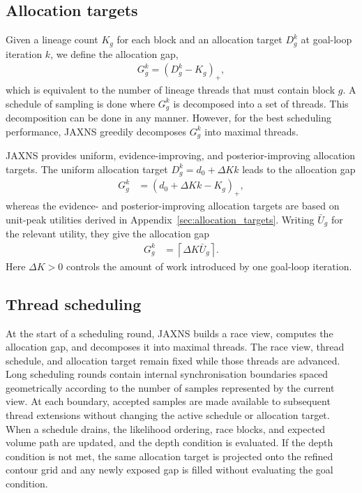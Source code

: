 \documentclass[pdflatex,sn-basic,icol]{sn-jnl}
\theoremstyle{plain}
\theoremstyle{definition}
\begin{document}
\subsection{Allocation targets}
Given a lineage count $K_g$ for each block and an allocation target $D_g^k$ at goal-loop iteration $k$, we define the allocation gap,
\begin{align}
    G_g^k = (D_g^k - K_g)_+,
    \label{eq:allocation_gap}
\end{align}
which is equivalent to the number of lineage threads that must contain block $g$.
A schedule of sampling is done where $G_g^k$ is decomposed into a set of threads.
This decomposition can be done in any manner.
However, for the best scheduling performance, JAXNS greedily decomposes $G_g^k$ into maximal threads.

JAXNS provides uniform, evidence-improving, and posterior-improving allocation targets.
The uniform allocation target $D_g^k=d_0+\Delta K k$ leads to the allocation gap
\begin{align}
    G_g^k &= (d_0+\Delta K k-K_g)_+,
    \label{eq:uniform_allocation_gap}
\end{align}
whereas the evidence- and posterior-improving allocation targets are based on unit-peak utilities derived in Appendix~\ref{sec:allocation_targets}.
Writing $\bar U_g$ for the relevant utility, they give the allocation gap
\begin{align}
    G_g^k &= \left\lceil\Delta K\bar U_g\right\rceil.
    \label{eq:utility_allocation_gap}
\end{align}
Here $\Delta K>0$ controls the amount of work introduced by one goal-loop iteration.

\subsection{Thread scheduling}

At the start of a scheduling round, JAXNS builds a race view, computes the allocation gap, and decomposes it into maximal threads.
The race view, thread schedule, and allocation target remain fixed while those threads are advanced.
Long scheduling rounds contain internal synchronisation boundaries spaced geometrically according to the number of samples represented by the current view.
At each boundary, accepted samples are made available to subsequent thread extensions without changing the active schedule or allocation target.
When a schedule drains, the likelihood ordering, race blocks, and expected volume path are updated, and the depth condition is evaluated.
If the depth condition is not met, the same allocation target is projected onto the refined contour grid and any newly exposed gap is filled without evaluating the goal condition.
\end{document}
